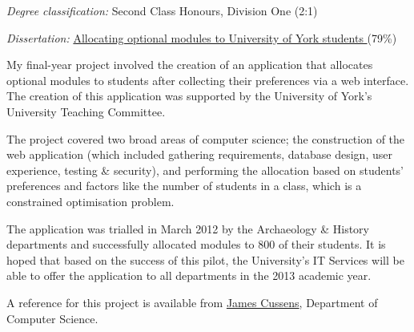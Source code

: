 \documentclass[10pt,a4paper]{article}
\renewenvironment{itemize}{
  \begin{list}{}{
    \setlength{\leftmargin}{1.5em}
    \setlength{\itemsep}{0.25em}
    \setlength{\parskip}{0pt}
    \setlength{\parsep}{0.25em}
  }
}{
  \end{list}
}
\begin{document}
\begin{itemize}
  \item \textit{Degree classification:} Second Class Honours, Division One (2:1)
  \item \textit{Dissertation:}
    \href{http://alex.mullr.net/blog/2012/03/constrained-optimisation-allocate-modules-york/}{
      Allocating optional modules to University of York students
    } (79\%)
\end{itemize}

My final-year project involved the creation of an application that allocates
optional modules to students after collecting their preferences via a web
interface. The creation of this application was supported by the University of
York's University Teaching Committee.

The project covered two broad areas of computer science; the construction of
the web application (which included gathering requirements, database design,
user experience, testing \& security), and performing the allocation based on
students' preferences and factors like the number of students in a class,
which is a constrained optimisation problem.

The application was trialled in March 2012 by the Archaeology \& History
departments and successfully allocated modules to 800 of their students. It is
hoped that based on the success of this pilot, the University's IT Services
will be able to offer the application to all departments in the 2013 academic
year.

A reference for this project is available from
\href{http://www-users.cs.york.ac.uk/~jc/}{James Cussens}, Department of
Computer Science.


\medskip

\end{document}
